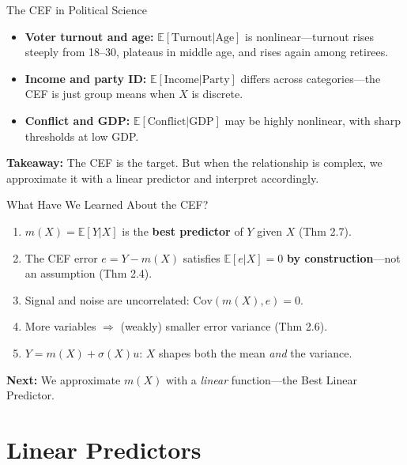 \documentclass[aspectratio=169]{beamer}
\numberwithin{equation}{section}
\begin{document}
\begin{frame}{The CEF in Political Science}
\begin{itemize}
\item \textbf{Voter turnout and age:} $\mathbb{E}[\text{Turnout}|\text{Age}]$ is nonlinear---turnout rises steeply from 18--30, plateaus in middle age, and rises again among retirees.\pause
\item \textbf{Income and party ID:} $\mathbb{E}[\text{Income}|\text{Party}]$ differs across categories---the CEF is just group means when $X$ is discrete.\pause
\item \textbf{Conflict and GDP:} $\mathbb{E}[\text{Conflict}|\text{GDP}]$ may be highly nonlinear, with sharp thresholds at low GDP.
\end{itemize}
\bigskip
\textbf{Takeaway:} The CEF is the target. But when the relationship is complex, we approximate it with a linear predictor and interpret accordingly.
\end{frame}

\begin{frame}{What Have We Learned About the CEF?}
\begin{tcolorbox}[colback=blue!5, colframe=blue!50, title=CEF Summary]
\begin{enumerate}
\item $m(X)=\mathbb{E}[Y|X]$ is the \textbf{best predictor} of $Y$ given $X$ (Thm 2.7).
\item The CEF error $e=Y-m(X)$ satisfies $\mathbb{E}[e|X]=0$ \textbf{by construction}---not an assumption (Thm 2.4).
\item Signal and noise are uncorrelated: $\text{Cov}(m(X), e)=0$.
\item More variables $\Rightarrow$ (weakly) smaller error variance (Thm 2.6).
\item $Y = m(X) + \sigma(X)u$: $X$ shapes both the mean \emph{and} the variance.
\end{enumerate}
\end{tcolorbox}
\medskip
\textbf{Next:} We approximate $m(X)$ with a \emph{linear} function---the Best Linear Predictor.
\end{frame}

\section{Linear Predictors}
\end{document}
